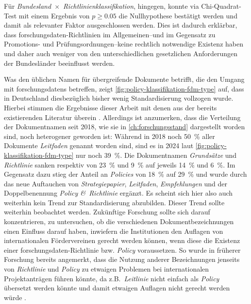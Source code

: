 Für \textit{Bundesland}~$\times$~\textit{Richtlinienklassifikation}, hingegen, konnte via Chi-Quadrat-Test mit einem Ergebnis von $p\geqslant\num{0,05}$ die Nullhypothese bestätigt werden und damit als relevanter Faktor ausgeschlossen werden.
Dies ist dadurch erklärbar, dass \gls{forschungsdaten}-Richtlinien im Allgemeinen--und im Gegensatz zu Promotions- und Prüfungsordnungen--keine rechtlich notwendige Existenz haben und daher auch weniger von den unterschiedlichen gesetzlichen Anforderungen der Bundesländer beeinflusst werden.

Was den üblichen Namen für übergreifende Dokumente betrifft, die den Umgang mit \glspl{forschungsdaten} betreffen, zeigt \cref{fig:policy-klassifikation-fdm-type} auf, dass in Deutschland diesbezüglich bisher wenig Standardisierung vollzogen wurde.
Hierbei stimmen die Ergebnisse dieser Arbeit mit denen aus der bereits existierenden Literatur überein \autocite{Hiemenz2018-fdm-title,Hiemenz2018-fdm-report}.
Allerdings ist anzumerken, dass die Verteilung der Dokumentnamen seit 2018, wie sie in \cref{ch:forschungsstand} dargestellt worden sind, noch heterogener geworden ist:
Während in 2018 noch \SI{50}{\percent} aller Dokumente \textit{Leitfaden} genannt worden sind, sind es in 2024 laut \cref{fig:policy-klassifikation-fdm-type} nur noch \SI{39}{\percent}.
Die Dokumentnamen \textit{Grundsätze} und \textit{Richtlinie} sanken respektiv von \SI{23}{\percent} und \SI{9}{\percent} auf jeweils \SI{14}{\percent} und \SI{6}{\percent}.
Im Gegensatz dazu stieg der Anteil an \textit{Policies} von \SI{18}{\percent} auf \SI{29}{\percent} und wurde durch das neue Auftauchen von \textit{Strategiepapier}, \textit{Leitfaden}, \textit{Empfehlungen} und der Doppelbenennung \textit{Policy \&\ Richtlinie} ergänzt.
Es scheint sich hier also auch weiterhin kein Trend zur Standardisierung abzubilden.
Dieser Trend sollte weiterhin beobachtet werden.
Zukünftige Forschung sollte sich darauf konzentrieren, zu untersuchen, ob die verschiedenen Dokumentbezeichnungen einen Einfluss darauf haben, inwiefern die Institutionen den Auflagen von internationalen Fördervereinen gerecht werden können, wenn diese die Existenz einer \gls{forschungsdaten}-Richtlinie bzw. \textit{Policy} voraussetzen.
So wurde in früherer Forschung bereits angemerkt, dass die Nutzung anderer Bezeichnungen jenseits von \textit{Richtlinie} und \textit{Policy} zu etwaigen Problemen bei internationalen Projektanträgen führen könnte, da z.B.~\textit{Leitlinie} nicht einfach als \textit{Policy} übersetzt werden könnte und damit etwaigen Auflagen nicht gerecht werden würde \autocite[8]{Hiemenz2018-fdm-report}.

